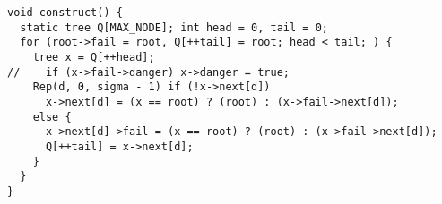 \begin{lstlisting}
void construct() {
  static tree Q[MAX_NODE]; int head = 0, tail = 0;
  for (root->fail = root, Q[++tail] = root; head < tail; ) {
    tree x = Q[++head];
//    if (x->fail->danger) x->danger = true;
    Rep(d, 0, sigma - 1) if (!x->next[d])
      x->next[d] = (x == root) ? (root) : (x->fail->next[d]);
    else {
      x->next[d]->fail = (x == root) ? (root) : (x->fail->next[d]);
      Q[++tail] = x->next[d];
    }
  }
}
\end{lstlisting}